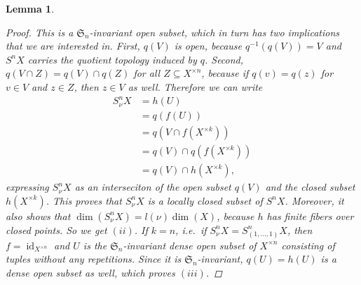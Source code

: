 \documentclass[12pt,a4paper]{amsart}
\theoremstyle{plain}
\newtheorem{lm}[thm]{Lemma}
\theoremstyle{definition}
\theoremstyle{remark}
\begin{document}
\begin{lm}
\begin{proof}
    This is a $\mathfrak{S}_{n}$-invariant open subset, which in turn has two implications that we are interested in.
    First, $q(V)$ is open, because $q^{-1}(q(V)) = V$ and $S^{n}X$ carries the quotient topology induced by $q$.
    Second, $q(V \cap Z) = q(V) \cap q(Z)$ for all $Z \subseteq X^{\times n}$, because if $q(v) = q(z)$ for $v \in V$ and $z \in Z$, then $z \in V$ as well.
    Therefore we can write
    \begin{align*}
      S_{\nu}^{n}X & = h(U) \\
      & = q(f(U)) \\
      & = q(V \cap f(X^{\times k})) \\
      & = q(V) \cap q(f(X^{\times k})) \\
      & = q(V) \cap h(X^{\times k}),
    \end{align*}
    expressing $S_{\nu}^{n}X$ as an interseciton of the open subset $q(V)$ and the closed subset $h(X^{\times k})$.
    This proves that $S_{\nu}^{n}X$ is a locally closed subset of $S^{n}X$.
    Moreover, it also shows that $\dim(S_{\nu}^{n}X) = l(\nu)\dim(X)$, because $h$ has finite fibers over closed points.
    So we get $(ii)$.
    If $k = n$, i.e.~if $S^{n}_{\nu}X = S^{n}_{(1,\ldots, 1)}X$, then $f = \operatorname{id}_{X^{\times n}}$ and $U$ is the $\mathfrak{S}_{n}$-invariant dense open subset of $X^{\times n}$ consisting of tuples without any repetitions.
    Since it is $\mathfrak{S}_{n}$-invariant, $q(U) = h(U)$ is a dense open subset as well, which proves $(iii)$.
    

\end{proof}
\end{lm}
\end{document}
